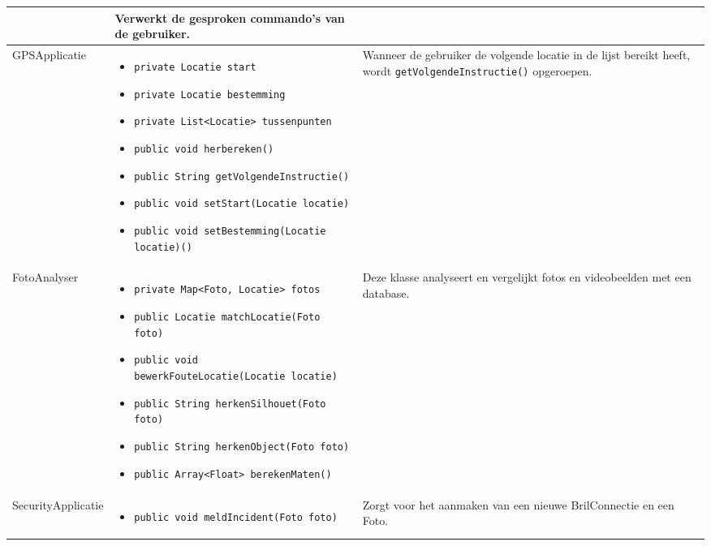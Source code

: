 \documentclass[12pt,a4paper,oneside]{article}
\begin{document}
\begin{longtable}{|l|p{6cm}|p{5cm}|}
\begin{itemize}[parsep=-2pt,leftmargin=0.3cm]
\end{itemize}&Verwerkt de gesproken commando's van de gebruiker.\\
\hline
GPSApplicatie&\vspace*{-10mm}\begin{itemize}[parsep=-2pt,leftmargin=0.3cm] 
\item \texttt{private Locatie start} 
\item \texttt{private Locatie bestemming} 
\item \texttt{private List<Locatie> tussenpunten} 
\item \texttt{public void herbereken()}  
\item \texttt{public String getVolgendeInstructie()} 
\item \texttt{public void setStart(Locatie locatie)}
\item \texttt{public void setBestemming(Locatie locatie)()}
\vspace*{-6mm} 
\end{itemize}&Wanneer de gebruiker de volgende locatie in de lijst bereikt heeft, wordt \texttt{getVolgendeInstructie()} opgeroepen.\\
\hline
FotoAnalyser&\vspace*{-10mm}\begin{itemize}[parsep=-2pt,leftmargin=0.3cm]
\item \texttt{private Map<Foto, Locatie> fotos}
\item \texttt{public Locatie matchLocatie(Foto foto)} 
\item \texttt{public void bewerkFouteLocatie(Locatie locatie)}
\item \texttt{public String herkenSilhouet(Foto foto)}
\item \texttt{public String herkenObject(Foto foto)}
\item \texttt{public Array<Float> berekenMaten()}\vspace*{-6mm} 
\end{itemize}& Deze klasse analyseert en vergelijkt fotos en videobeelden met een database.\\
\hline
SecurityApplicatie &\vspace*{-10mm}\begin{itemize}[parsep=-2pt,leftmargin=0.3cm] \item \texttt{public void meldIncident(Foto foto)} \vspace*{-6mm} 
\end{itemize}& Zorgt voor het aanmaken van een nieuwe BrilConnectie en een Foto.\\

\end{longtable}
\end{document}

